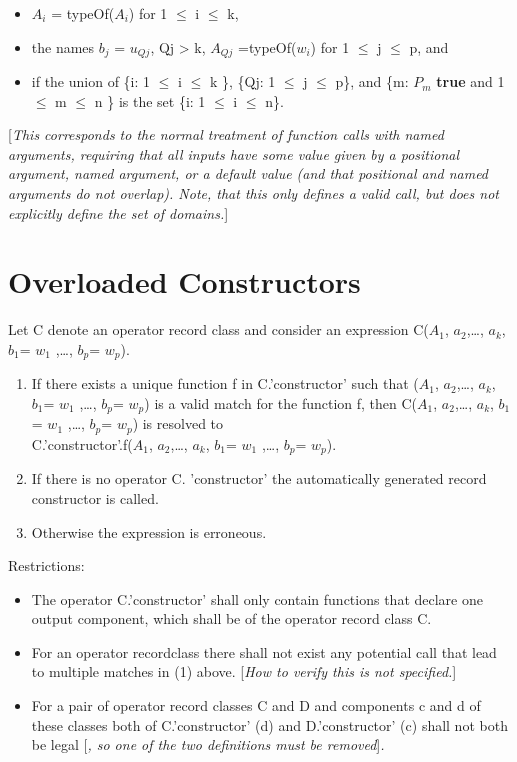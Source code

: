 \documentclass[10pt,a4paper]{report}
\def\doublelabel#1{\label{#1}}
\renewcommand{\labelenumi}{\arabic{enumi}.}
\begin{document}
\begin{itemize}
\item
  $A_{i}$ = typeOf($A_{i}$) for 1 $\le$ i $\le$ k,
\item
  the names $b_{j}$ = $u_{Qj}$, Qj \textgreater{}
  k, $A_{Qj}$ =typeOf($w_{i}$) for 1 $\le$ j $\le$ p, and
\item
  if the union of \{i: 1 $\le$ i $\le$ k \}, \{Qj: 1 $\le$ j $\le$ p\}, and \{m:
  $P_{m}$ \textbf{true} and 1 $\le$ m $\le$ n \} is the set \{i: 1 $\le$
  i $\le$ n\}.
\end{itemize}

{[}\emph{This corresponds to the normal treatment of function calls with
named arguments, requiring that all inputs have some value given by a
positional argument, named argument, or a default value (and that
positional and named arguments do not overlap). Note, that this only
defines a valid call, but does not explicitly define the set of
domains.}{]}

\section{Overloaded Constructors}\doublelabel{overloaded-constructors}

Let C denote an operator record class and consider an expression
C($A_1$, $a_{2}$,\ldots{}, $a_{k}$,
$b_{1}$= $w_{1}$ ,\ldots{}, $b_{p}$=
$w_{p}$).

\begin{enumerate}
\def\labelenumi{\arabic{enumi}.}
\item
  If there exists a {unique} function f in C.'constructor' such that
  ($A_1$, $a_{2}$,\ldots{}, $a_{k}$,
  $b_{1}$= $w_{1}$ ,\ldots{}, $b_{p}$=
  $w_{p}$) is a valid match for the function f, then
  C($A_1$, $a_{2}$,\ldots{}, $a_{k}$,
  $b_{1}$= $w_{1}$ ,\ldots{}, $b_{p}$=
  $w_{p}$) is resolved to\\
  C.'constructor'.f($A_1$, $a_{2}$,\ldots{},
  $a_{k}$, $b_{1}$= $w_{1}$ ,\ldots{},
  $b_{p}$= $w_{p}$).
\item
  If there is no operator C. 'constructor' the automatically generated
  record constructor is called.
\item
  Otherwise the expression is erroneous.
\end{enumerate}

Restrictions:

\begin{itemize}
\item
  The operator C.'constructor' shall only contain functions that declare
  one output component, which shall be of the operator record class C.
\item
  For an operator recordclass there shall not exist any potential call
  that lead to multiple matches in (1) above. {[}\emph{How to verify
  this is not specified.}{]}
\item
  For a pair of operator record classes C and D and components c and d
  of these classes both of C.'constructor' (d) and D.'constructor' (c)
  shall not both be legal {[}\emph{, so one of the two definitions must
  be removed}{]}\emph{.}
\end{itemize}
\end{document}

